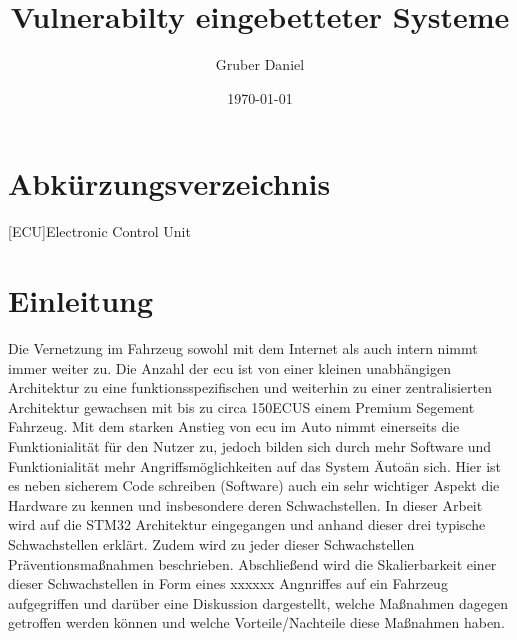 \documentclass[a4paper,
DIV=13,
12pt,
BCOR=10mm,
department=FakIM,
oneside,
parskip=half,
automark,
listof=totocnumbered,
bibliography=totocnumbered,
acronym=totocnumbered
] {OTHRartcl}
\date{\today}
\title{Vulnerabilty eingebetteter Systeme}
\author{Gruber Daniel}
\begin{document}
\maketitle

\tableofcontents
\newpage

\section*{Abkürzungsverzeichnis}
\label{abkuerzungsverzeichnis}
\begin{acronym}[AUTOSAR]
[ECU]{Electronic Control Unit}
\end{acronym}


\section{Einleitung}
Die Vernetzung im Fahrzeug sowohl mit dem Internet als auch intern nimmt immer weiter zu. Die Anzahl der \acs{ecu} ist von einer kleinen unabhängigen Architektur
zu eine funktionsspezifischen und weiterhin zu einer zentralisierten Architektur gewachsen mit bis zu circa 150ECUS einem Premium Segement Fahrzeug.
Mit dem starken Anstieg von \acs{ecu} im Auto nimmt einerseits die Funktionialität für den Nutzer zu, jedoch bilden sich durch mehr Software und Funktionialität
mehr Angriffsmöglichkeiten auf das System \"Auto\" an sich. Hier ist es neben sicherem Code schreiben (Software) auch ein sehr wichtiger Aspekt
die Hardware zu kennen und insbesondere deren Schwachstellen.
In dieser Arbeit wird auf die STM32 Architektur eingegangen und anhand dieser drei typische Schwachstellen erklärt. Zudem wird zu jeder dieser
Schwachstellen Präventionsmaßnahmen beschrieben.
Abschließend wird die Skalierbarkeit einer dieser Schwachstellen in Form eines xxxxxx Angnriffes auf ein Fahrzeug aufgegriffen und darüber
eine Diskussion dargestellt, welche Maßnahmen dagegen getroffen werden können und welche Vorteile/Nachteile diese Maßnahmen haben.


\end{document}
